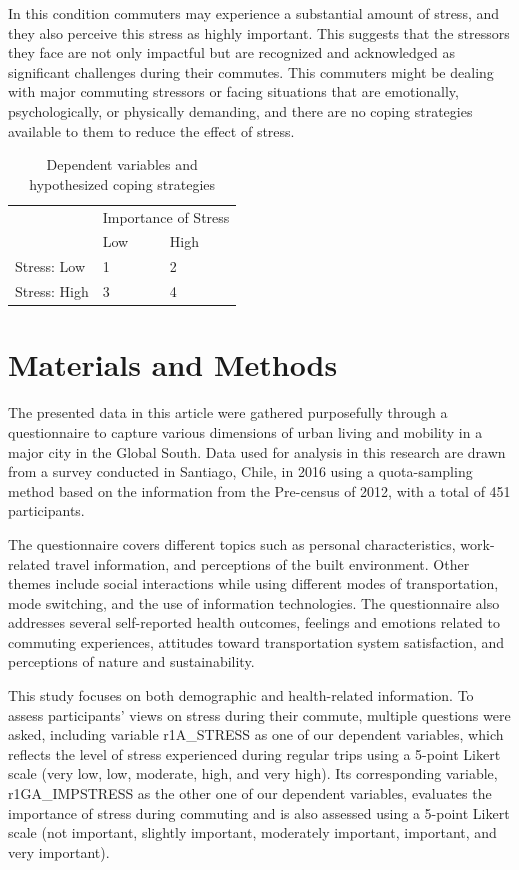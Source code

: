 \documentclass[
11pt, %
oneside, %
english, %
singlespacing, %
]{macthesis} %
\begin{document}
In this condition commuters may experience a substantial amount of stress, and they also perceive this stress as highly important. This suggests that the stressors they face are not only impactful but are recognized and acknowledged as significant challenges during their commutes. This commuters might be dealing with major commuting stressors or facing situations that are emotionally, psychologically, or physically demanding, and there are no coping strategies available to them to reduce the effect of stress.
\begin{table}[!h]

\caption{\label{tab:unnamed-chunk-20}\label{tab:hypotheses}Dependent variables and hypothesized coping strategies}
\centering
\begin{tabular}[t]{lll}
\toprule
\multicolumn{1}{c}{} & \multicolumn{2}{c}{Importance of Stress} \\
\cmidrule(l{3pt}r{3pt}){2-3}
 & Low & High\\
\midrule
Stress: Low & 1 & 2\\
Stress: High & 3 & 4\\
\bottomrule
\end{tabular}
\end{table}
\hypertarget{materials-and-methods}{%
\section{Materials and Methods}\label{materials-and-methods}}

The presented data in this article were gathered purposefully through a questionnaire to capture various dimensions of urban living and mobility in a major city in the Global South. Data used for analysis in this research are drawn from a survey conducted in Santiago, Chile, in 2016 using a quota-sampling method based on the information from the Pre-census of 2012, with a total of 451 participants.

The questionnaire covers different topics such as personal characteristics, work-related travel information, and perceptions of the built environment. Other themes include social interactions while using different modes of transportation, mode switching, and the use of information technologies. The questionnaire also addresses several self-reported health outcomes, feelings and emotions related to commuting experiences, attitudes toward transportation system satisfaction, and perceptions of nature and sustainability.

This study focuses on both demographic and health-related information. To assess participants' views on stress during their commute, multiple questions were asked, including variable r1A\_STRESS as one of our dependent variables, which reflects the level of stress experienced during regular trips using a 5-point Likert scale (very low, low, moderate, high, and very high). Its corresponding variable, r1GA\_IMPSTRESS as the other one of our dependent variables, evaluates the importance of stress during commuting and is also assessed using a 5-point Likert scale (not important, slightly important, moderately important, important, and very important).
\end{document}
